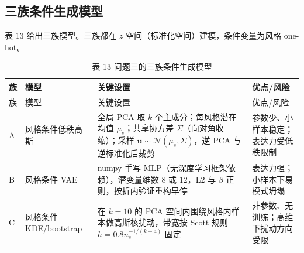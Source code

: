 \documentclass[
  a4paper,12pt]{article}
\begin{document}
\subsection{三族条件生成模型}\label{ux4e09ux65cfux6761ux4ef6ux751fux6210ux6a21ux578b}

表 13 给出三族模型。三族都在 \(z\)
空间（标准化空间）建模，条件变量为风格 one-hot。

\begin{longtable}[]{@{}
  >{\raggedright\arraybackslash}p{}
  >{\raggedright\arraybackslash}p{}
  >{\raggedright\arraybackslash}p{}
  >{\raggedright\arraybackslash}p{}@{}}
\caption{表 13 问题三的三族条件生成模型}\tabularnewline
\toprule\noalign{}
\begin{minipage}[b]{\linewidth}\raggedright
族
\end{minipage} & \begin{minipage}[b]{\linewidth}\raggedright
模型
\end{minipage} & \begin{minipage}[b]{\linewidth}\raggedright
关键设置
\end{minipage} & \begin{minipage}[b]{\linewidth}\raggedright
优点/风险
\end{minipage} \\
\midrule\noalign{}
\endfirsthead
\toprule\noalign{}
\begin{minipage}[b]{\linewidth}\raggedright
族
\end{minipage} & \begin{minipage}[b]{\linewidth}\raggedright
模型
\end{minipage} & \begin{minipage}[b]{\linewidth}\raggedright
关键设置
\end{minipage} & \begin{minipage}[b]{\linewidth}\raggedright
优点/风险
\end{minipage} \\
\midrule\noalign{}
\endhead
\bottomrule\noalign{}
\endlastfoot
A & 风格条件低秩高斯 & 全局 PCA 取 \(k\) 个主成分；每风格潜在均值
\(\mu_s\)；共享协方差 \(\Sigma\)（向对角收缩）；采样
\(\mathbf{u}\sim\mathcal{N}(\mu_s,\Sigma)\)，逆 PCA 与逆标准化后裁剪 &
参数少、小样本稳定；表达力受低秩限制 \\
B & 风格条件 VAE & numpy 手写 MLP（无深度学习框架依赖），潜变量维数 8 或
12，L2 与 \(\beta\) 正则，按折内验证重构早停 &
表达力强；小样本下易模式坍塌 \\
C & 风格条件 KDE/bootstrap & 在 \(k=10\) 的 PCA
空间内围绕风格内样本做高斯核扰动，带宽按 Scott 规则
\(h=0.8n_s^{-1/(k+4)}\) 固定 & 非参数、无训练；高维下扰动方向受限 \\
\end{longtable}
\end{document}
